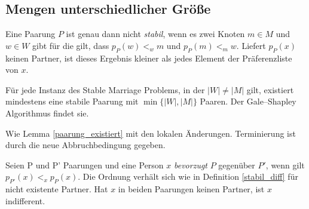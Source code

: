 \subsection{Mengen unterschiedlicher Größe}
\begin{frame}
  \begin{Definition}
  \label{stabil_diff}
    Eine Paarung $P$ ist genau dann nicht \textit{stabil}, wenn es zwei Knoten $m \in M$ und $w \in W$ gibt für die gilt, dass $p_{P}(w) <_{w} m$ und $p_{P}(m) <_{m} w$. Liefert $p_{P}(x)$ keinen Partner, ist dieses Ergebnis kleiner als jedes Element der Präferenzliste von $x$.
  \end{Definition}
\end{frame}

\begin{frame}
  \begin{Theorem}
  \label{paarung_existiert_diff}
    Für jede Instanz des Stable Marriage Problems, in der $|W| \neq |M|$ gilt, existiert mindestens eine stabile Paarung mit $\min\{|W|,|M|\}$ Paaren. Der Gale–Shapley Algorithmus findet sie.
  \end{Theorem}

  \begin{Beweis}
  \label{paarung_existiert_diff_bew}
    Wie Lemma \ref{paarung_existiert} mit den lokalen Änderungen. Terminierung ist durch die neue Abbruchbedingung gegeben.
  \end{Beweis}
\end{frame}

\begin{frame}
  \begin{Definition}
  \label{vorziehen}
    Seien P und P' Paarungen und eine Person $x$ \textit{bevorzugt} $P$ gegenüber $P'$, wenn gilt $p_{P'}(x) <_{x} p_{P}(x)$. Die Ordnung verhält sich wie in Definition \ref{stabil_diff} für nicht existente Partner. Hat $x$ in beiden Paarungen keinen Partner, ist $x$ indifferent.
  \end{Definition}
\end{frame}

